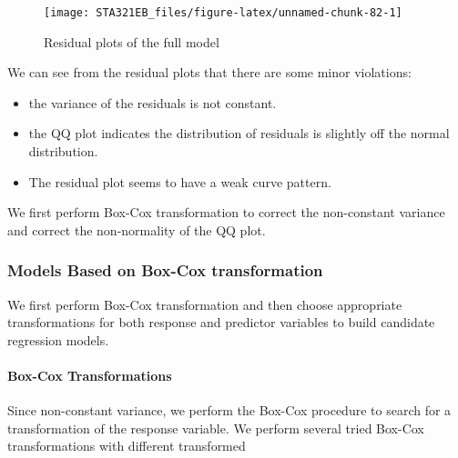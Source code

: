 \documentclass[
]{book}
\begin{document}
\begin{figure}

{\centering \texttt{[image: STA321EB\_files/figure-latex/unnamed-chunk-82-1]} 

}

\caption{Residual plots of the full model}\label{fig:unnamed-chunk-82}
\end{figure}

We can see from the residual plots that there are some minor violations:

\begin{itemize}
\item
  the variance of the residuals is not constant.
\item
  the QQ plot indicates the distribution of residuals is slightly off the normal distribution.
\item
  The residual plot seems to have a weak curve pattern.
\end{itemize}

We first perform Box-Cox transformation to correct the non-constant variance and correct the non-normality of the QQ plot.

\hypertarget{models-based-on-box-cox-transformation}{%
\subsubsection{Models Based on Box-Cox transformation}\label{models-based-on-box-cox-transformation}}

We first perform Box-Cox transformation and then choose appropriate transformations for both response and predictor variables to build candidate regression models.

\hypertarget{box-cox-transformations}{%
\paragraph{Box-Cox Transformations}\label{box-cox-transformations}}

Since non-constant variance, we perform the Box-Cox procedure to search for a transformation of the response variable. We perform several tried Box-Cox transformations with different transformed
\end{document}
